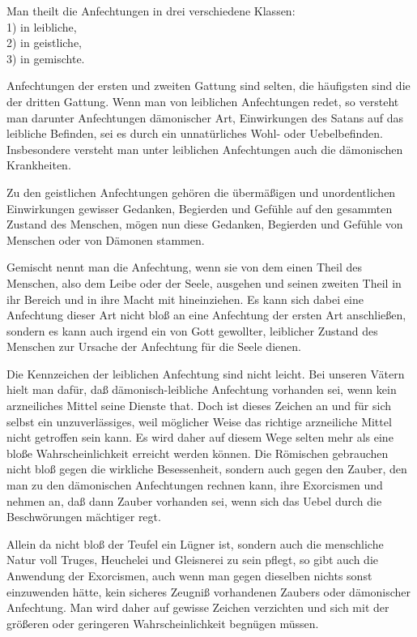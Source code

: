 Man theilt die Anfechtungen in drei verschiedene Klassen:\\
1) in leibliche,\\
2) in geistliche,\\
3) in gemischte.

Anfechtungen der ersten und zweiten Gattung sind selten, die häufigsten sind die der dritten Gattung. Wenn man von leiblichen Anfechtungen redet, so versteht man darunter Anfechtungen dämonischer Art, Einwirkungen des Satans auf das leibliche Befinden, sei es durch ein unnatürliches Wohl- oder Uebelbefinden. Insbesondere versteht man unter leiblichen Anfechtungen auch die dämonischen Krankheiten.

Zu den geistlichen Anfechtungen gehören die übermäßigen und unordentlichen Einwirkungen gewisser Gedanken, Begierden und Gefühle auf den gesammten Zustand des Menschen, mögen nun diese Gedanken, Begierden und Gefühle von Menschen oder von Dämonen stammen.

Gemischt nennt man die Anfechtung, wenn sie von dem einen Theil des Menschen, also dem Leibe oder der Seele, ausgehen und seinen zweiten Theil in ihr Bereich und in ihre Macht mit hineinziehen. Es kann sich dabei eine Anfechtung dieser Art nicht bloß an eine Anfechtung der ersten Art anschließen, sondern es kann auch irgend ein von Gott gewollter, leiblicher Zustand des Menschen zur Ursache der Anfechtung für die Seele dienen.

Die Kennzeichen der leiblichen Anfechtung sind nicht leicht. Bei unseren Vätern hielt man dafür, daß dämonisch-leibliche Anfechtung vorhanden sei, wenn kein arzneiliches Mittel seine Dienste that. Doch ist dieses Zeichen an und für sich selbst ein unzuverlässiges, weil möglicher Weise das richtige arzneiliche Mittel nicht getroffen sein kann. Es wird daher auf diesem Wege selten mehr als eine bloße Wahrscheinlichkeit erreicht werden können. Die Römischen gebrauchen
nicht bloß gegen die wirkliche Besessenheit, sondern auch gegen den Zauber, den man zu den dämonischen Anfechtungen rechnen kann, ihre Exorcismen und nehmen an, daß dann Zauber vorhanden sei, wenn sich das Uebel durch die Beschwörungen mächtiger regt.

Allein da nicht bloß der Teufel ein Lügner ist, sondern auch die menschliche Natur voll Truges, Heuchelei und Gleisnerei zu sein pflegt, so gibt auch die Anwendung der Exorcismen, auch wenn man gegen dieselben nichts sonst einzuwenden hätte, kein sicheres Zeugniß vorhandenen Zaubers oder dämonischer Anfechtung. Man wird daher auf gewisse Zeichen verzichten und sich mit der größeren oder geringeren Wahrscheinlichkeit begnügen müssen.

